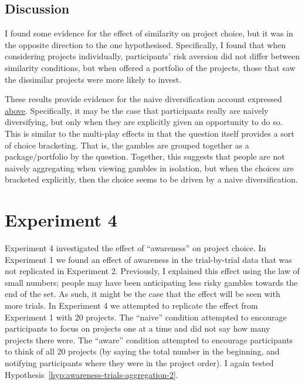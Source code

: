 \documentclass[a4paper, nobind, dvipsnames]{templates/ociamthesis}
\theoremstyle{definition}
\theoremstyle{definition}
\theoremstyle{definition}
\theoremstyle{definition}
\theoremstyle{remark}
\begin{document}
\hypertarget{discussion-6}{%
\subsection{Discussion}\label{discussion-6}}

I found some evidence for the effect of similarity on project choice, but it was
in the opposite direction to the one hypothesised. Specifically, I found that
when considering projects individually, participants' risk aversion did not
differ between similarity conditions, but when offered a portfolio of the
projects, those that saw the dissimilar projects were more likely to invest.

These results provide evidence for the naive diversification account expressed
\protect\hyperlink{similarity-discussion-aggregation-1}{above}. Specifically, it may be the case
that participants really are naively diversifying, but only when they are
explicitly given an opportunity to do so. This is similar to the multi-play
effects in that the question itself provides a sort of choice bracketing. That
is, the gambles are grouped together as a package/portfolio by the question.
Together, this suggests that people are not naively aggregating when viewing
gambles in isolation, but when the choices are bracketed explicitly, then the
choice seems to be driven by a naive diversification.

\hypertarget{aggregation-4}{%
\section{Experiment 4}\label{aggregation-4}}

Experiment 4 investigated the effect of ``awareness'' on project choice. In
Experiment 1 we found an effect of awareness in the trial-by-trial data that was
not replicated in Experiment 2. Previously, I explained this effect using the
law of small numbers; people may have been anticipating less risky gambles
towards the end of the set. As such, it might be the case that the effect will
be seen with more trials. In Experiment 4 we attempted to replicate the effect
from Experiment 1 with 20 projects. The ``naive'' condition attempted to encourage
participants to focus on projects one at a time and did not say how many
projects there were. The ``aware'' condition attempted to encourage participants
to think of all 20 projects (by saying the total number in the beginning, and
notifying participants where they were in the project order). I again tested Hypothesis~\ref{hyp:awareness-trials-aggregation-2}.
\end{document}
